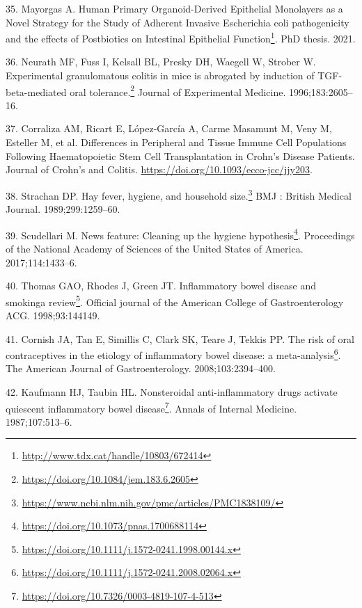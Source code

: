 \documentclass[
  12pt,
  a4paper,
  twoside,
  openright]{book}
\DeclareRobustCommand{\href}[2]{#2\footnote{\url{#1}}}
\newlength{\cslhangindent}
\newlength{\cslentryspacingunit} %
\newenvironment{CSLReferences}[2] %
 {%
  \setlength{\parindent}{0pt}
  \ifodd #1
  \let\oldpar\par
  \def\par{\hangindent=\cslhangindent\oldpar}
  \fi
  \setlength{\parskip}{#2\cslentryspacingunit}
 }%
 {}
\begin{document}
\begin{CSLReferences}{0}{0}
\leavevmode{}%
35. Mayorgas A. \href{http://www.tdx.cat/handle/10803/672414}{Human Primary Organoid-Derived Epithelial Monolayers as a Novel Strategy for the Study of Adherent Invasive Escherichia coli pathogenicity and the effects of Postbiotics on Intestinal Epithelial Function}. PhD thesis. 2021.

\leavevmode{}%
36. Neurath MF, Fuss I, Kelsall BL, Presky DH, Waegell W, Strober W. \href{https://doi.org/10.1084/jem.183.6.2605}{Experimental granulomatous colitis in mice is abrogated by induction of TGF-beta-mediated oral tolerance.} Journal of Experimental Medicine. 1996;183:2605--16.

\leavevmode{}%
37. Corraliza AM, Ricart E, López-García A, Carme Masamunt M, Veny M, Esteller M, et al. Differences in Peripheral and Tissue Immune Cell Populations Following Haematopoietic Stem Cell Transplantation in Crohn{'}s Disease Patients. Journal of Crohn's and Colitis. \url{https://doi.org/10.1093/ecco-jcc/jjy203}.

\leavevmode{}%
38. Strachan DP. \href{https://www.ncbi.nlm.nih.gov/pmc/articles/PMC1838109/}{Hay fever, hygiene, and household size.} BMJ : British Medical Journal. 1989;299:1259--60.

\leavevmode{}%
39. Scudellari M. \href{https://doi.org/10.1073/pnas.1700688114}{News feature: Cleaning up the hygiene hypothesis}. Proceedings of the National Academy of Sciences of the United States of America. 2017;114:1433--6.

\leavevmode{}%
40. Thomas GAO, Rhodes J, Green JT. \href{https://doi.org/10.1111/j.1572-0241.1998.00144.x}{Inflammatory bowel disease and smoking{\textemdash}a review}. Official journal of the American College of Gastroenterology \textbar{} ACG. 1998;93:144149.

\leavevmode{}%
41. Cornish JA, Tan E, Simillis C, Clark SK, Teare J, Tekkis PP. \href{https://doi.org/10.1111/j.1572-0241.2008.02064.x}{The risk of oral contraceptives in the etiology of inflammatory bowel disease: a meta-analysis}. The American Journal of Gastroenterology. 2008;103:2394--400.

\leavevmode{}%
42. Kaufmann HJ, Taubin HL. \href{https://doi.org/10.7326/0003-4819-107-4-513}{Nonsteroidal anti-inflammatory drugs activate quiescent inflammatory bowel disease}. Annals of Internal Medicine. 1987;107:513--6.


\end{CSLReferences}
\end{document}
